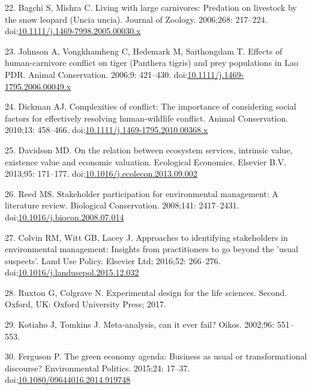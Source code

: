 \documentclass[10pt,letterpaper]{article}
\begin{document}
\hypertarget{ref-Bagchi2006}{}
22. Bagchi S, Mishra C. Living with large carnivores: Predation on
livestock by the snow leopard (Uncia uncia). Journal of Zoology.
2006;268: 217--224.
doi:\href{https://doi.org/10.1111/j.1469-7998.2005.00030.x}{10.1111/j.1469-7998.2005.00030.x}

\hypertarget{ref-Johnson2006}{}
23. Johnson A, Vongkhamheng C, Hedemark M, Saithongdam T. Effects of
human-carnivore conflict on tiger (Panthera tigris) and prey populations
in Lao PDR. Animal Conservation. 2006;9: 421--430.
doi:\href{https://doi.org/10.1111/j.1469-1795.2006.00049.x}{10.1111/j.1469-1795.2006.00049.x}

\hypertarget{ref-Dickman2010}{}
24. Dickman AJ. Complexities of conflict: The importance of considering
social factors for effectively resolving human-wildlife conflict. Animal
Conservation. 2010;13: 458--466.
doi:\href{https://doi.org/10.1111/j.1469-1795.2010.00368.x}{10.1111/j.1469-1795.2010.00368.x}

\hypertarget{ref-Davidson2013}{}
25. Davidson MD. On the relation between ecosystem services, intrinsic
value, existence value and economic valuation. Ecological Economics.
Elsevier B.V. 2013;95: 171--177.
doi:\href{https://doi.org/10.1016/j.ecolecon.2013.09.002}{10.1016/j.ecolecon.2013.09.002}

\hypertarget{ref-Reed2008}{}
26. Reed MS. Stakeholder participation for environmental management: A
literature review. Biological Conservation. 2008;141: 2417--2431.
doi:\href{https://doi.org/10.1016/j.biocon.2008.07.014}{10.1016/j.biocon.2008.07.014}

\hypertarget{ref-Colvin2016}{}
27. Colvin RM, Witt GB, Lacey J. Approaches to identifying stakeholders
in environmental management: Insights from practitioners to go beyond
the 'usual suspects'. Land Use Policy. Elsevier Ltd; 2016;52: 266--276.
doi:\href{https://doi.org/10.1016/j.landusepol.2015.12.032}{10.1016/j.landusepol.2015.12.032}

\hypertarget{ref-Ruxton2017}{}
28. Ruxton G, Colgrave N. Experimental design for the life sciences.
Second. Oxford, UK: Oxford University Press; 2017.

\hypertarget{ref-Kotiaho2002}{}
29. Kotiaho J, Tomkins J. Meta-analysis, can it ever fail? Oikos.
2002;96: 551--553.

\hypertarget{ref-Ferguson2015}{}
30. Ferguson P. The green economy agenda: Business as usual or
transformational discourse? Environmental Politics. 2015;24: 17--37.
doi:\href{https://doi.org/10.1080/09644016.2014.919748}{10.1080/09644016.2014.919748}
\end{document}
